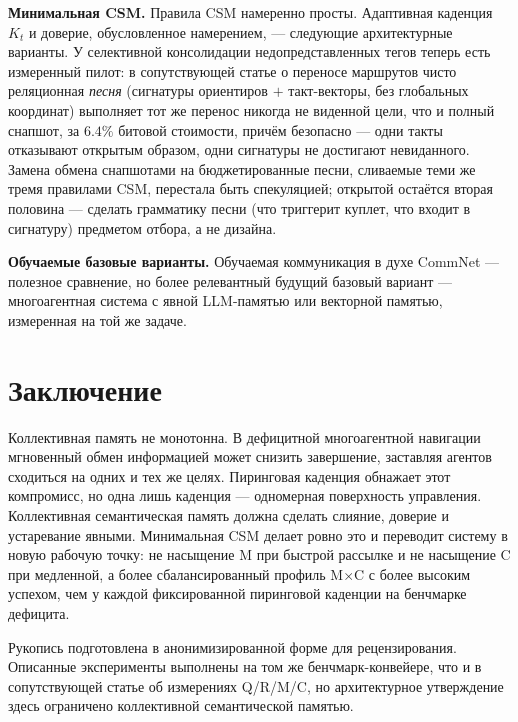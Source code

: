 \documentclass{article}
\begin{document}
\textbf{Минимальная CSM.} Правила CSM намеренно просты. Адаптивная
каденция $K_t$ и доверие, обусловленное намерением, --- следующие
архитектурные варианты. У селективной консолидации недопредставленных
тегов теперь есть измеренный пилот: в сопутствующей статье о переносе
маршрутов чисто реляционная \emph{песня} (сигнатуры ориентиров $+$
такт-векторы, без глобальных координат) выполняет тот же перенос
никогда не виденной цели, что и полный снапшот, за $6.4\%$ битовой
стоимости, причём безопасно --- одни такты отказывают открытым
образом, одни сигнатуры не достигают невиданного. Замена обмена
снапшотами на бюджетированные песни, сливаемые теми же тремя правилами
CSM, перестала быть спекуляцией; открытой остаётся вторая половина ---
сделать грамматику песни (что триггерит куплет, что входит в
сигнатуру) предметом отбора, а не дизайна.

\textbf{Обучаемые базовые варианты.} Обучаемая коммуникация в духе
CommNet --- полезное сравнение, но более релевантный будущий базовый
вариант --- многоагентная система с явной LLM-памятью или векторной
памятью, измеренная на той же задаче.

\section{Заключение}

Коллективная память не монотонна. В дефицитной многоагентной
навигации мгновенный обмен информацией может снизить завершение,
заставляя агентов сходиться на одних и тех же целях. Пиринговая
каденция обнажает этот компромисс, но одна лишь каденция --- одномерная
поверхность управления. Коллективная семантическая память должна
сделать слияние, доверие и устаревание явными. Минимальная CSM делает
ровно это и переводит систему в новую рабочую точку: не насыщение M
при быстрой рассылке и не насыщение C при медленной, а более
сбалансированный профиль M$\times$C с более высоким успехом, чем у
каждой фиксированной пиринговой каденции на бенчмарке дефицита.

\begin{ack}
Рукопись подготовлена в анонимизированной форме для рецензирования.
Описанные эксперименты выполнены на том же бенчмарк-конвейере, что и в
сопутствующей статье об измерениях Q/R/M/C, но архитектурное
утверждение здесь ограничено коллективной семантической памятью.
\end{ack}
\end{document}
